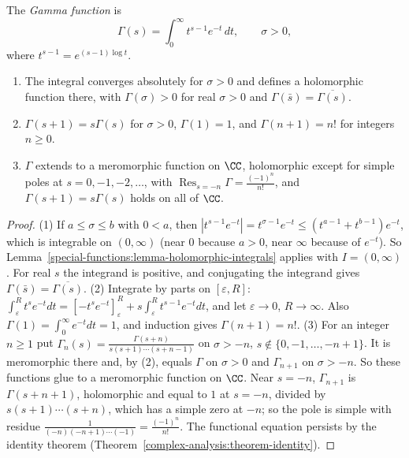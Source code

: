 \begin{definition}\label{special-functions:definition-gamma}
The \emph{Gamma function} is
\[
\Gamma(s) = \int_0^\infty t^{s-1}e^{-t}\,dt, \qquad \sigma > 0,
\]
where $t^{s-1} = e^{(s-1)\log t}$.
\end{definition}

\begin{proposition}\label{special-functions:proposition-gamma-basic}
\begin{enumerate}
\item The integral converges absolutely for $\sigma > 0$ and defines a holomorphic function there, with $\Gamma(\sigma) > 0$ for real $\sigma > 0$ and $\Gamma(\bar s) = \overline{\Gamma(s)}$.
\item $\Gamma(s + 1) = s\Gamma(s)$ for $\sigma > 0$, $\Gamma(1) = 1$, and $\Gamma(n + 1) = n!$ for integers $n \geq 0$.
\item $\Gamma$ extends to a meromorphic function on $\CC$, holomorphic except for simple poles at $s = 0, -1, -2, \ldots$, with $\operatorname{Res}_{s = -n}\Gamma = \frac{(-1)^n}{n!}$, and
$\Gamma(s + 1) = s\Gamma(s)$ holds on all of $\CC$.
\end{enumerate}
\end{proposition}

\begin{proof}
(1) If $a \leq \sigma \leq b$ with $0 < a$, then $|t^{s-1}e^{-t}| = t^{\sigma - 1}e^{-t} \leq (t^{a-1} + t^{b-1})e^{-t}$, which is integrable on $(0, \infty)$ (near $0$ because $a > 0$, near $\infty$
because of $e^{-t}$). So Lemma~\ref{special-functions:lemma-holomorphic-integrals} applies with $I = (0, \infty)$. For real $s$ the integrand is positive, and conjugating the integrand gives
$\Gamma(\bar s) = \overline{\Gamma(s)}$.
(2) Integrate by parts on $[\varepsilon, R]$: $\int_\varepsilon^Rt^se^{-t}dt = [-t^se^{-t}]_\varepsilon^R + s\int_\varepsilon^Rt^{s-1}e^{-t}dt$, and let $\varepsilon \to 0$, $R \to \infty$. Also
$\Gamma(1) = \int_0^\infty e^{-t}dt = 1$, and induction gives $\Gamma(n + 1) = n!$.
(3) For an integer $n \geq 1$ put $\Gamma_n(s) = \frac{\Gamma(s + n)}{s(s + 1)\cdots(s + n - 1)}$ on $\sigma > -n$, $s \notin \{0, -1, \ldots, -n + 1\}$. It is meromorphic there and, by (2),
equals $\Gamma$ on $\sigma > 0$ and $\Gamma_{n+1}$ on $\sigma > -n$. So these functions glue to a meromorphic function on $\CC$. Near $s = -n$, $\Gamma_{n+1}$ is $\Gamma(s + n + 1)$, holomorphic and
equal to $1$ at $s = -n$, divided by $s(s + 1)\cdots(s + n)$, which has a simple zero at $-n$; so the pole is simple with residue
$\frac{1}{(-n)(-n + 1)\cdots(-1)} = \frac{(-1)^n}{n!}$. The functional equation persists by the identity theorem (Theorem~\ref{complex-analysis:theorem-identity}).
\end{proof}

